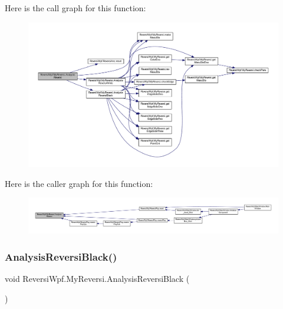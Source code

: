 Here is the call graph for this function\+:\nopagebreak
\begin{figure}[H]
\begin{center}
\leavevmode
\includegraphics[width=350pt]{class_reversi_wpf_1_1_my_reversi_a14a3c0720db3ff11196e0c7c34bd80c0_cgraph}
\end{center}
\end{figure}
Here is the caller graph for this function\+:\nopagebreak
\begin{figure}[H]
\begin{center}
\leavevmode
\includegraphics[width=350pt]{class_reversi_wpf_1_1_my_reversi_a14a3c0720db3ff11196e0c7c34bd80c0_icgraph}
\end{center}
\end{figure}
\mbox{\label{class_reversi_wpf_1_1_my_reversi_af7ca68ea9f05d79c1debbdc320555098}} 
\subsubsection{\texorpdfstring{Analysis\+Reversi\+Black()}{AnalysisReversiBlack()}}
{\footnotesize\ttfamily void Reversi\+Wpf.\+My\+Reversi.\+Analysis\+Reversi\+Black (\begin{DoxyParamCaption}{ }\end{DoxyParamCaption})\hspace{0.3cm}{\ttfamily [private]}}



